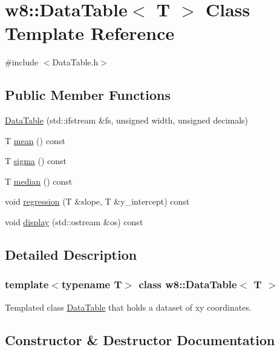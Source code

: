 \hypertarget{classw8_1_1DataTable}{}\section{w8\+:\+:Data\+Table$<$ T $>$ Class Template Reference}
\label{classw8_1_1DataTable}


{\ttfamily \#include $<$Data\+Table.\+h$>$}

\subsection*{Public Member Functions}
\begin{DoxyCompactItemize}
\item 
\mbox{\hyperlink{classw8_1_1DataTable_a3d0250d377c570935b96f063a7aad7ea}{Data\+Table}} (std\+::ifstream \&fs, unsigned width, unsigned decimals)
\item 
T \mbox{\hyperlink{classw8_1_1DataTable_a39deb646a7ce0e6a91a24d422113f693}{mean}} () const
\item 
T \mbox{\hyperlink{classw8_1_1DataTable_a0117321b63383aa310a9034662e25d8b}{sigma}} () const
\item 
T \mbox{\hyperlink{classw8_1_1DataTable_a70bf19f3fe4003c0ebaee0f978a7ab5f}{median}} () const
\item 
void \mbox{\hyperlink{classw8_1_1DataTable_a258b4c9bcac9a4eb60cb7e6f1131cf5f}{regression}} (T \&slope, T \&y\+\_\+intercept) const
\item 
void \mbox{\hyperlink{classw8_1_1DataTable_a5f12eff627602dbff8e3f8a039557fb3}{display}} (std\+::ostream \&os) const
\end{DoxyCompactItemize}


\subsection{Detailed Description}
\subsubsection*{template$<$typename T$>$\newline
class w8\+::\+Data\+Table$<$ T $>$}

Templated class \mbox{\hyperlink{classw8_1_1DataTable}{Data\+Table}} that holds a dataset of xy coordinates. 

\subsection{Constructor \& Destructor Documentation}
\mbox{\label{classw8_1_1DataTable_a3d0250d377c570935b96f063a7aad7ea}} 
